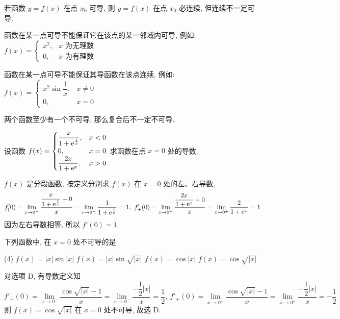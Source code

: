 \begin{theorem}[函数的可导性与连续性]
    若函数 $y=f(x)$ 在点 $x_0$ 可导, 则 $y=f(x)$ 在点 $x_0$ 必连续, 但连续不一定可导.

    函数在某一点可导不能保证它在该点的某一邻域内可导, 例如: $f(x)=\begin{cases}
            x^2, & x\text{ 为无理数} \\
            0,   & x\text{ 为有理数}
        \end{cases}$

    函数在某一点可导不能保证其导函数在该点连续, 例如: $f(x)=\begin{cases}
            x^2\sin\dfrac{1}{x}, & x\neq0 \\
            0,                   & x=0
        \end{cases}$

    两个函数至少有一个不可导, 那么复合后不一定不可导.
\end{theorem}

\begin{example}
    设函数 $f(x)=\begin{cases}
        \dfrac{x}{1+\mathrm{e} ^{\frac{1}{x}}},&x<0\\0,&x=0\\ \dfrac{2x}{1+\mathrm{e}^x},&x>0
    \end{cases}$ 求函数在点 $x=0$ 处的导数.
\end{example}
\begin{solution}
    $f(x)$ 是分段函数, 按定义分别求 $f(x)$ 在 $x=0$ 处的左、右导数, 
    $$f'_(0)=\lim_{x\to0^-}\dfrac{\dfrac{x}{1+\mathrm{e} ^{\frac{1}{x}}}-0}{x}=\lim_{x\to0 ^-}\dfrac{1}{1+\mathrm{e} ^{\frac{1}{x}}}=1,~f'_+(0)=\lim_{x\to0^+}\dfrac{\dfrac{2x}{1+\mathrm{e}^x}-0}{x}=\lim_{x\to0^+}\dfrac{2}{1+\mathrm{e}^x}=1$$
    因为左右导数相等, 所以 $f'(0)=1$.
\end{solution}

\begin{example}[2018 数一]
    下列函数中, 在 $x=0$ 处不可导的是
    \begin{tasks}(4)
        \task $f(x)=|x|\sin |x|$
        \task $f(x)=|x|\sin \sqrt{|x|}$
        \task $f(x)=\cos |x|$
        \task $f(x)=\cos \sqrt{|x|}$
    \end{tasks}
\end{example}
\begin{solution}
    对选项 D, 有导数定义知
    $$f'_-(0)=\lim_{x\to0^-}\dfrac{\cos\sqrt{|x|}-1}{x}=\lim_{x\to0^-}\dfrac{-\dfrac{1}{2}|x|}{x}=\dfrac{1}{2},~f'_+(0)=\lim_{x\to0^+}\dfrac{\cos\sqrt{|x|}-1}{x}=\lim_{x\to0^+}\dfrac{-\dfrac{1}{2}|x|}{x}=-\dfrac{1}{2}$$
    则 $f(x)=\cos \sqrt{|x|}$ 在 $x=0$ 处不可导, 故选 D.
\end{solution}

